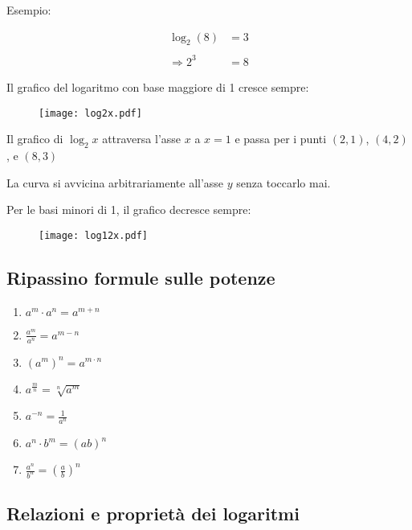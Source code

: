 Esempio:

\begin{equation*}
\begin{split}
\log_2(8)&=3 \\
\\
\Rightarrow 2^3&=8
\end{split}
\end{equation*}

Il grafico del logaritmo con base maggiore di 1 cresce sempre:

\begin{figure}[H]
\centering
\texttt{[image: log2x.pdf]}
\end{figure}

Il grafico di $\log_2x$ attraversa l'asse $x$ a $x = 1$ e passa per i punti $(2, 1)$, $(4, 2)$, e $(8, 3)$

La curva si avvicina arbitrariamente all'asse $y$  senza toccarlo mai.

Per le basi minori di 1, il grafico decresce sempre:

\begin{figure}[H]
\centering
\texttt{[image: log12x.pdf]}
\end{figure}



\subsection{Ripassino formule sulle potenze}

\begin{enumerate}
\item $a^m \cdot a^n = a^{m+n}$
\item $\frac{a^m}{a^n}=a^{m-n}$
\item $(a^m)^n=a^{m\cdot n}$
\item $a^\frac{m}{n}=\sqrt[n]{a^m}$
\item $a^{-n}=\frac{1}{a^n}$
\item $a^n \cdot b^m=(ab)^n$
\item $\frac{a^n}{b^n}=\left(\frac{a}{b}\right)^n$
\end{enumerate}


\subsection{Relazioni e proprietà dei logaritmi}

